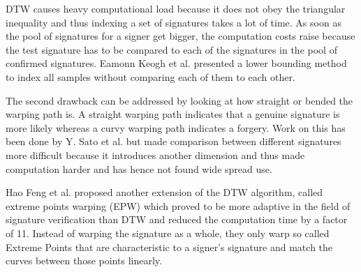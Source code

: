 \documentclass[a4paper, oneside]{csthesis}
\begin{document}
DTW causes heavy computational load because it does not obey the triangular inequality and thus indexing a set of signatures takes a lot of time. As soon as the pool of signatures for a signer get bigger, the computation costs raise because the test signature has to be compared to each of the signatures in the pool of confirmed signatures. Eamonn Keogh et al. \cite{Keogh:2002:EID:1287369.1287405} presented a lower bounding method to index all samples without comparing each of them to each other.

The second drawback can be addressed by looking at how straight or bended the warping path is. A straight warping path indicates that a genuine signature is more likely whereas a curvy warping path indicates a forgery. Work on this has been done by Y. Sato et al. \cite{Sato1982} but made comparison between different signatures more difficult because it introduces another dimension and thus made computation harder and has hence not found wide spread use.

Hao Feng et al. \cite{Feng:2003:OSV:961320.961331} proposed another extension of the DTW algorithm, called extreme points warping (EPW) which proved to be more adaptive in the field of signature verification than DTW and reduced the computation time by a factor of 11.  Instead of warping the signature as a whole, they only warp so called Extreme Points that are characteristic to a signer's signature and match the curves between those points linearly.




\end{document}
